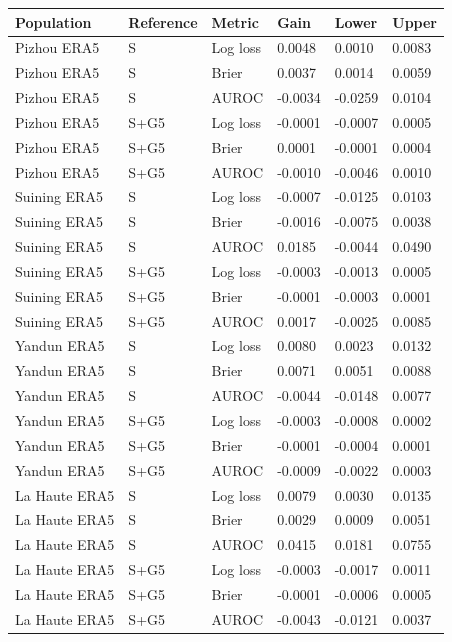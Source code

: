 \documentclass[a4paper,11pt]{article}
\newcounter{none}
\begin{document}
{\def\LTcaptype{none} %
\begin{longtable}[]{@{}llllll@{}}
\toprule\noalign{}
Population & Reference & Metric & Gain & Lower & Upper \\
\midrule\noalign{}
\endhead
\bottomrule\noalign{}
\endlastfoot
Pizhou ERA5 & S & Log loss & 0.0048 & 0.0010 & 0.0083 \\
Pizhou ERA5 & S & Brier & 0.0037 & 0.0014 & 0.0059 \\
Pizhou ERA5 & S & AUROC & -0.0034 & -0.0259 & 0.0104 \\
Pizhou ERA5 & S+G5 & Log loss & -0.0001 & -0.0007 & 0.0005 \\
Pizhou ERA5 & S+G5 & Brier & 0.0001 & -0.0001 & 0.0004 \\
Pizhou ERA5 & S+G5 & AUROC & -0.0010 & -0.0046 & 0.0010 \\
Suining ERA5 & S & Log loss & -0.0007 & -0.0125 & 0.0103 \\
Suining ERA5 & S & Brier & -0.0016 & -0.0075 & 0.0038 \\
Suining ERA5 & S & AUROC & 0.0185 & -0.0044 & 0.0490 \\
Suining ERA5 & S+G5 & Log loss & -0.0003 & -0.0013 & 0.0005 \\
Suining ERA5 & S+G5 & Brier & -0.0001 & -0.0003 & 0.0001 \\
Suining ERA5 & S+G5 & AUROC & 0.0017 & -0.0025 & 0.0085 \\
Yandun ERA5 & S & Log loss & 0.0080 & 0.0023 & 0.0132 \\
Yandun ERA5 & S & Brier & 0.0071 & 0.0051 & 0.0088 \\
Yandun ERA5 & S & AUROC & -0.0044 & -0.0148 & 0.0077 \\
Yandun ERA5 & S+G5 & Log loss & -0.0003 & -0.0008 & 0.0002 \\
Yandun ERA5 & S+G5 & Brier & -0.0001 & -0.0004 & 0.0001 \\
Yandun ERA5 & S+G5 & AUROC & -0.0009 & -0.0022 & 0.0003 \\
La Haute ERA5 & S & Log loss & 0.0079 & 0.0030 & 0.0135 \\
La Haute ERA5 & S & Brier & 0.0029 & 0.0009 & 0.0051 \\
La Haute ERA5 & S & AUROC & 0.0415 & 0.0181 & 0.0755 \\
La Haute ERA5 & S+G5 & Log loss & -0.0003 & -0.0017 & 0.0011 \\
La Haute ERA5 & S+G5 & Brier & -0.0001 & -0.0006 & 0.0005 \\
La Haute ERA5 & S+G5 & AUROC & -0.0043 & -0.0121 & 0.0037 \\

\end{longtable}}
\end{document}
